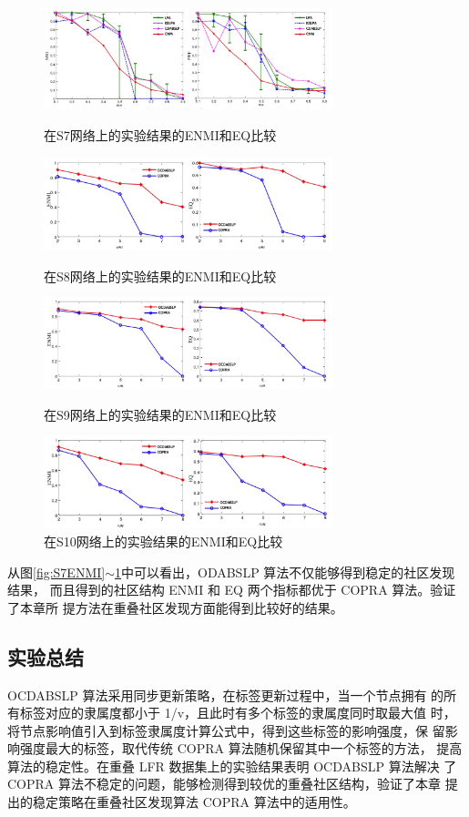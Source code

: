 \begin{figure}
  \centering
  \includegraphics[width=0.75\textwidth]{figures/S2deNMIhePWF}
  \caption{在S7网络上的实验结果的ENMI和EQ比较}\label{fig:S7ENMI}

  \includegraphics[width=0.75\textwidth]{figures/S8ENMI}
  \caption{在S8网络上的实验结果的ENMI和EQ比较}\label{fig:S8ENMI}

  \includegraphics[width=0.75\textwidth]{figures/S9ENMI}
  \caption{在S9网络上的实验结果的ENMI和EQ比较}\label{fig:S9ENMI}

  \includegraphics[width=0.75\textwidth]{figures/S10ENMI}
  \caption{在S10网络上的实验结果的ENMI和EQ比较}\label{fig:S10ENMI}

\end{figure}

从图\ref{fig:S7ENMI}$\sim$\ref{fig:S10ENMI}中可以看出，ODABSLP 算法不仅能够得到稳定的社区发现结果，
而且得到的社区结构 ENMI 和 EQ 两个指标都优于 COPRA 算法。验证了本章所
提方法在重叠社区发现方面能得到比较好的结果。

\subsection{实验总结}

OCDABSLP 算法采用同步更新策略，在标签更新过程中，当一个节点拥有
的所有标签对应的隶属度都小于 1/v，且此时有多个标签的隶属度同时取最大值
时，将节点影响值引入到标签隶属度计算公式中，得到这些标签的影响强度，保
留影响强度最大的标签，取代传统 COPRA 算法随机保留其中一个标签的方法，
提高算法的稳定性。在重叠 LFR 数据集上的实验结果表明 OCDABSLP 算法解决
了 COPRA 算法不稳定的问题，能够检测得到较优的重叠社区结构，验证了本章
提出的稳定策略在重叠社区发现算法 COPRA 算法中的适用性。
